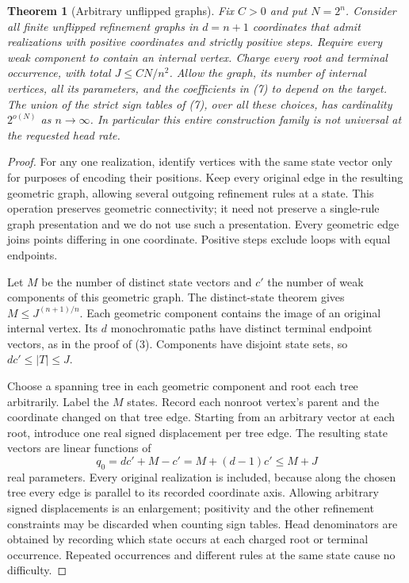 \documentclass[11pt]{article}
\newtheorem{theorem}{Theorem}
\begin{document}
\begin{theorem}[Arbitrary unflipped graphs]
Fix $C>0$ and put $N=2^n$. Consider all finite unflipped refinement
graphs in $d=n+1$ coordinates that admit realizations with positive
coordinates and strictly positive steps. Require every weak component
to contain an internal vertex. Charge every root and terminal occurrence,
with total $J\le CN/n^2$. Allow the graph, its number of internal
vertices, all its parameters, and the coefficients in (7) to depend
on the target. The union of the strict sign tables of (7), over all
these choices, has cardinality $2^{o(N)}$ as $n\to\infty$.
In particular this entire construction family is not universal at the
requested head rate.
\end{theorem}
\begin{proof}
For any one realization, identify vertices with the same state vector
only for purposes of encoding their positions. Keep every original edge
in the resulting geometric graph, allowing several outgoing refinement
rules at a state. This operation preserves geometric connectivity; it
need not preserve a single-rule graph presentation and we do not use
such a presentation. Every geometric edge joins points differing in one
coordinate. Positive steps exclude loops with equal endpoints.

Let $M$ be the number of distinct state vectors and $c'$ the number
of weak components of this geometric graph. The distinct-state theorem
gives $M\le J^{(n+1)/n}$. Each geometric component contains the image
of an original internal vertex. Its $d$ monochromatic paths have
distinct terminal endpoint vectors, as in the proof of (3). Components
have disjoint state sets, so $dc'\le |T|\le J$.

Choose a spanning tree in each geometric component and root each tree
arbitrarily. Label the $M$ states. Record each nonroot vertex's parent
and the coordinate changed on that tree edge. Starting from an arbitrary
vector at each root, introduce one real signed displacement per tree
edge. The resulting state vectors are linear functions of
\[
                  q_0=dc'+M-c'=M+(d-1)c'\le M+J
                  \tag{14}
\]
real parameters. Every original realization is included, because along
the chosen tree every edge is parallel to its recorded coordinate
axis. Allowing arbitrary signed displacements is an enlargement;
positivity and the other refinement constraints may be discarded when
counting sign tables. Head denominators are obtained by recording which
state occurs at each charged root or terminal occurrence. Repeated
occurrences and different rules at the same state cause no difficulty.


\end{proof}
\end{document}
